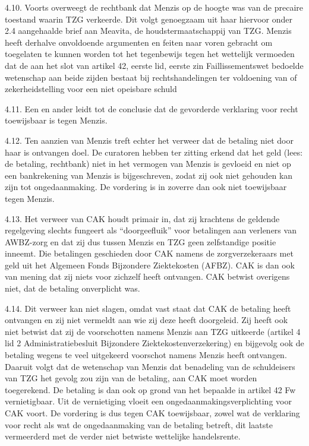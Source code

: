 \documentclass[
  dutch,
  a4paper,
]{article}
\begin{document}
4.10. Voorts overweegt de rechtbank dat Menzis op de hoogte was van de precaire toestand waarin TZG verkeerde. Dit volgt genoegzaam uit haar hiervoor onder 2.4 aangehaalde brief aan Meavita, de houdstermaatschappij van TZG. Menzis heeft derhalve onvoldoende argumenten en feiten naar voren gebracht om toegelaten te kunnen worden tot het tegenbewijs tegen het wettelijk vermoeden dat de aan het slot van artikel 42, eerste lid, eerste zin Faillissementswet bedoelde wetenschap aan beide zijden bestaat bij rechtshandelingen ter voldoening van of zekerheidstelling voor een niet opeisbare schuld

4.11. Een en ander leidt tot de conclusie dat de gevorderde verklaring voor recht toewijsbaar is tegen Menzis.

4.12. Ten aanzien van Menzis treft echter het verweer dat de betaling niet door haar is ontvangen doel. De curatoren hebben ter zitting erkend dat het geld (lees: de betaling, rechtbank) niet in het vermogen van Menzis is gevloeid en niet op een bankrekening van Menzis is bijgeschreven, zodat zij ook niet gehouden kan zijn tot ongedaanmaking. De vordering is in zoverre dan ook niet toewijsbaar tegen Menzis.

4.13. Het verweer van CAK houdt primair in, dat zij krachtens de geldende regelgeving slechts fungeert als ``doorgeefluik'' voor betalingen aan verleners van AWBZ-zorg en dat zij dus tussen Menzis en TZG geen zelfstandige positie inneemt. Die betalingen geschieden door CAK namens de zorgverzekeraars met geld uit het Algemeen Fonds Bijzondere Ziektekosten (AFBZ). CAK is dan ook van mening dat zij niets voor zichzelf heeft ontvangen. CAK betwist overigens niet, dat de betaling onverplicht was.

4.14. Dit verweer kan niet slagen, omdat vast staat dat CAK de betaling heeft ontvangen en zij niet vermeldt aan wie zij deze heeft doorgeleid. Zij heeft ook niet betwist dat zij de voorschotten namens Menzis aan TZG uitkeerde (artikel 4 lid 2 Administratiebesluit Bijzondere Ziektekostenverzekering) en bijgevolg ook de betaling wegens te veel uitgekeerd voorschot namens Menzis heeft ontvangen. Daaruit volgt dat de wetenschap van Menzis dat benadeling van de schuldeisers van TZG het gevolg zou zijn van de betaling, aan CAK moet worden toegerekend. De betaling is dan ook op grond van het bepaalde in artikel 42 Fw vernietigbaar. Uit de vernietiging vloeit een ongedaanmakingsverplichting voor CAK voort. De vordering is dus tegen CAK toewijsbaar, zowel wat de verklaring voor recht als wat de ongedaanmaking van de betaling betreft, dit laatste vermeerderd met de verder niet betwiste wettelijke handelsrente.
\end{document}
